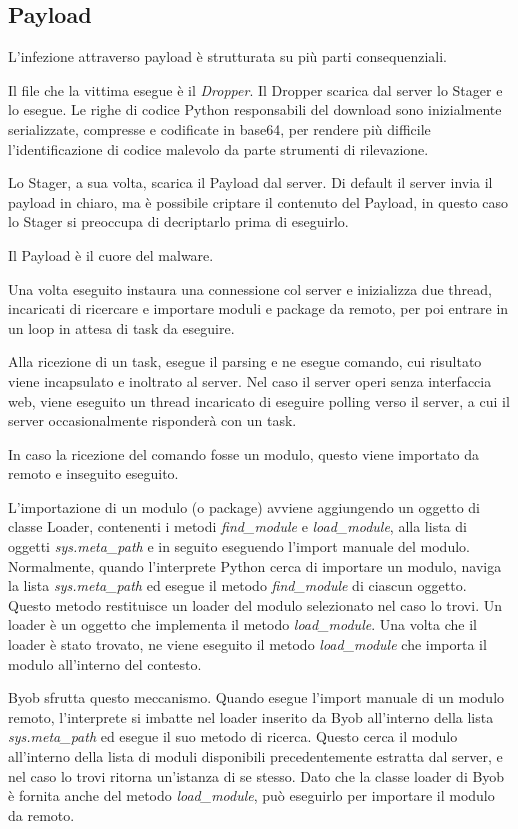 \subsection{Payload}

L'infezione attraverso payload è strutturata su più parti consequenziali.

Il file che la vittima esegue è il \textit{Dropper}.
Il Dropper scarica dal server lo Stager e lo esegue. Le righe di codice Python responsabili del download sono inizialmente serializzate, compresse e codificate in base64, per rendere più difficile l'identificazione di codice malevolo da parte strumenti di rilevazione.

Lo Stager, a sua volta, scarica il Payload dal server.  Di default il server invia il payload in chiaro, ma è possibile criptare il contenuto del Payload, in questo caso lo Stager si preoccupa di decriptarlo prima di eseguirlo.

Il Payload è il cuore del malware.

Una volta eseguito instaura una connessione col server e inizializza due thread, incaricati di ricercare e importare  moduli e package da remoto, per poi entrare in un loop in attesa di task da eseguire.

Alla ricezione di un task,  esegue il parsing e ne esegue comando, cui  risultato viene incapsulato e inoltrato al server.
Nel caso il server operi  senza interfaccia web, viene eseguito un thread incaricato di eseguire polling verso il server, a cui il server occasionalmente risponderà con un task.

In caso la ricezione del comando fosse un modulo, questo viene importato da remoto e inseguito eseguito.

L'importazione di un modulo (o package) avviene aggiungendo un oggetto di classe Loader, contenenti i metodi \textit{find\_module} e \textit{load\_module}, alla lista di oggetti \textit{sys.meta\_path} e in seguito eseguendo l'import manuale del modulo. 
Normalmente, quando l'interprete Python cerca di importare un modulo, naviga la lista \textit{sys.meta\_path} ed esegue il metodo \textit{find\_module} di ciascun oggetto. Questo metodo restituisce un loader del modulo selezionato nel caso lo trovi. Un loader è un oggetto che implementa il metodo \textit{load\_module}.
Una volta che il loader è stato trovato, ne viene eseguito il metodo \textit{load\_module} che importa il modulo all'interno del contesto.

Byob sfrutta questo meccanismo. Quando esegue l'import manuale di un modulo remoto, l'interprete si imbatte nel loader inserito da Byob all'interno della lista \textit{sys.meta\_path} ed esegue il suo metodo di ricerca. Questo cerca il modulo all'interno della lista di moduli disponibili precedentemente estratta dal server, e nel caso lo trovi ritorna un'istanza di se stesso. Dato che la classe loader di Byob è fornita anche del metodo \textit{load\_module}, può eseguirlo per importare il modulo da remoto.


